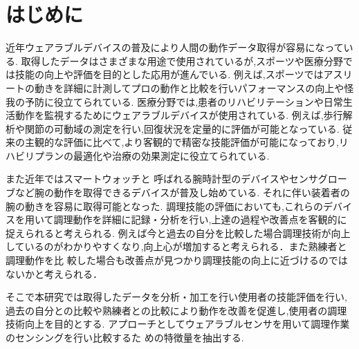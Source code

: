 \section{はじめに}
近年ウェアラブルデバイスの普及により人間の動作データ取得が容易になっている.
取得したデータはさまざまな用途で使用されているが,スポーツや医療分野では技能の向上や評価を目的とした応用が進んでいる.
例えば,スポーツではアスリートの動きを詳細に計測してプロの動作と比較を行いパフォーマンスの向上や怪我の予防に役立てられている.
医療分野では,患者のリハビリテーションや日常生活動作を監視するためにウェアラブルデバイスが使用されている.
例えば,歩行解析や関節の可動域の測定を行い,回復状況を定量的に評価が可能となっている.
従来の主観的な評価に比べて,より客観的で精密な技能評価が可能になっており,リハビリプランの最適化や治療の効果測定に役立てられている.

また近年ではスマートウォッチと
呼ばれる腕時計型のデバイスやセンサグローブなど腕の動作を取得できるデバイスが普及し始めている.
それに伴い装着者の腕の動きを容易に取得可能となった.
調理技能の評価においても,これらのデバイスを用いて調理動作を詳細に記録・分析を行い,上達の過程や改善点を客観的に捉えられると考えられる.
例えば今と過去の自分を比較した場合調理技術が向上しているのがわかりやすくなり,向上心が増加すると考えられる．また熟練者と調理動作を比
較した場合も改善点が見つかり調理技能の向上に近づけるのではないかと考えられる．

そこで本研究では取得したデータを分析・加工を行い使用者の技能評価を行い,
過去の自分との比較や熟練者との比較により動作を改善を促進し,使用者の調理技術向上を目的とする.
アプローチとしてウェアラブルセンサを用いて調理作業のセンシングを行い比較するた
めの特徴量を抽出する.